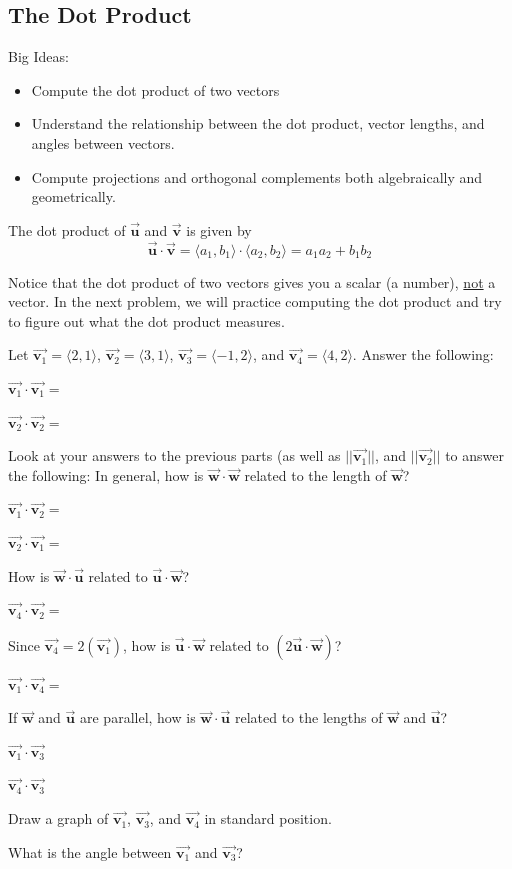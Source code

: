 \subsection{The Dot Product}
Big Ideas:
\begin{itemize}
\item Compute the dot product of two vectors
\item Understand the relationship between the dot product, vector lengths, and angles between vectors.
\item Compute projections and orthogonal complements both algebraically and geometrically.
\end{itemize}
\begin{info} The dot product of $\vec{\textbf{u}}$ and $\vec{\textbf{v}}$ is given by $$\vec{\textbf{u}} \cdot \vec{\textbf{v}} =\langle a_1,b_1\rangle \cdot \langle a_2,b_2 \rangle=a_1a_2+b_1b_2$$

Notice that the dot product of two vectors gives you a scalar (a number), \underline{not} a vector. In the next problem, we will practice computing the dot product and try to figure out what the dot product measures. \end{info}

\bq Let $\vec{\textbf{v}_1}=\langle 2,1\rangle$, $\vec{\textbf{v}_2}=\langle 3,1\rangle$, $\vec{\textbf{v}_3}=\langle -1,2\rangle$, and $\vec{\textbf{v}_4}=\langle 4,2\rangle$. Answer the following:
\be
\item $\vec{\textbf{v}_1} \cdot \vec{\textbf{v}_1}=$
\item $\vec{\textbf{v}_2} \cdot \vec{\textbf{v}_2}=$
\item Look at your answers to the previous parts (as well as $||\vec{\textbf{v}_1}||$, and $||\vec{\textbf{v}_2}||$ to answer the following: In general, how is $\vec{\textbf{w}} \cdot \vec{\textbf{w}}$ related to the length of $\vec{\textbf{w}}$?
\item $\vec{\textbf{v}_1} \cdot \vec{\textbf{v}_2}=$
\item $\vec{\textbf{v}_2} \cdot \vec{\textbf{v}_1}=$
\item How is $\vec{\textbf{w}} \cdot \vec{\textbf{u}}$ related to $\vec{\textbf{u}} \cdot \vec{\textbf{w}}$?
\item $\vec{\textbf{v}_4} \cdot \vec{\textbf{v}_2}=$
\item Since $\vec{\textbf{v}_4}= 2 (\vec{\textbf{v}_1})$, how is $\vec{\textbf{u}} \cdot \vec{\textbf{w}}$ related to $(2 \vec{\textbf{u}} \cdot \vec{\textbf{w}})$?
\item $\vec{\textbf{v}_1} \cdot \vec{\textbf{v}_4}=$
\item If $\vec{\textbf{w}}$ and $\vec{\textbf{u}}$ are parallel, how is $\vec{\textbf{w}} \cdot \vec{\textbf{u}}$ related to the lengths of $\vec{\textbf{w}}$ and $\vec{\textbf{u}}$?
\item $\vec{\textbf{v}_1} \cdot \vec{\textbf{v}_3}$
\item $\vec{\textbf{v}_4} \cdot \vec{\textbf{v}_3}$
\item Draw a graph of $\vec{\textbf{v}_1}$, $\vec{\textbf{v}_3}$, and $\vec{\textbf{v}_4}$ in standard position.
\item What is the angle between $\vec{\textbf{v}_1}$ and  $\vec{\textbf{v}_3}$?
\ee
\eq

